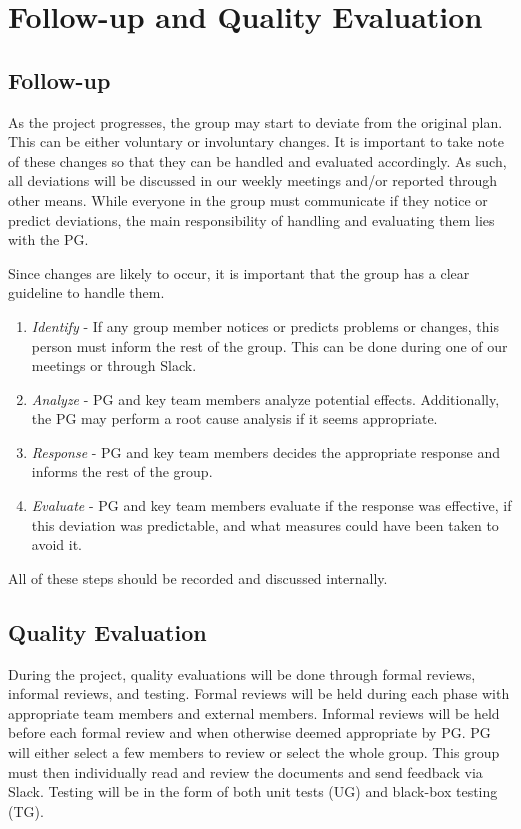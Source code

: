 \documentclass{article}
\begin{document}
\section{Follow-up and Quality Evaluation}
\subsection{Follow-up}
As the project progresses, the group may start to deviate from the original plan. This can be either voluntary or involuntary changes. It is important to take note of these changes so that they can be handled and evaluated accordingly. As such, all deviations will be discussed in our weekly meetings and/or reported through other means. While everyone in the group must communicate if they notice or predict deviations, the main responsibility of handling and evaluating them lies with the PG. 

Since changes are likely to occur, it is important that the group has a clear guideline to handle them.
\begin{enumerate}  
\item  \textit{Identify} - If any group member notices or predicts problems or changes, this person must inform the rest of the group. This can be done during one of our meetings or through Slack.
\item \textit{Analyze} - PG and key team members analyze potential effects. Additionally, the PG may perform a root cause analysis if it seems appropriate. 
\item \textit{Response} - PG and key team members decides the appropriate response and informs the rest of the group. 
 \item \textit{Evaluate} - PG and key team members evaluate if the response was effective, if this deviation was predictable, and what measures could have been taken to avoid it. 
\end{enumerate}

All of these steps should be recorded and discussed internally. 


\subsection{Quality Evaluation}
During the project, quality evaluations will be done through formal reviews, informal reviews, and testing. Formal reviews will be held during each phase with appropriate team members and external members. Informal reviews will be held before each formal review and when otherwise deemed appropriate by PG. PG will either select a few members to review or select the whole group. This group must then individually read and review the documents and send feedback via Slack. Testing will be in the form of both unit tests (UG) and black-box testing (TG).
\end{document}
